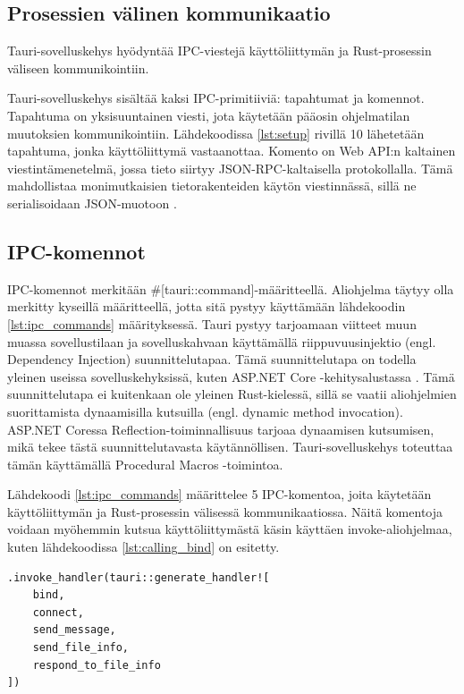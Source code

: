 \documentclass[a4paper,12pt]{article}
\begin{document}
    \subsection{Prosessien välinen kommunikaatio}
    Tauri-sovelluskehys hyödyntää IPC-viestejä käyttöliittymän ja Rust-prosessin väliseen kommunikointiin.

    Tauri-sovelluskehys sisältää kaksi IPC-primitiiviä: tapahtumat ja komennot.
    Tapahtuma on yksisuuntainen viesti, jota käytetään pääosin ohjelmatilan muutoksien kommunikointiin. Lähdekoodissa \ref{lst:setup} rivillä 10 lähetetään tapahtuma, jonka käyttöliittymä vastaanottaa. Komento on Web API:n kaltainen viestintämenetelmä, jossa tieto siirtyy JSON-RPC-kaltaisella protokollalla. Tämä mahdollistaa monimutkaisien tietorakenteiden käytön viestinnässä, sillä ne serialisoidaan JSON-muotoon \cite{tauri-app}.

    \subsection{IPC-komennot}
    IPC-komennot merkitään \#[tauri::command]-määritteellä. Aliohjelma täytyy olla merkitty kyseillä määritteellä, jotta sitä pystyy käyttämään lähdekoodin \ref{lst:ipc_commands} määrityksessä. Tauri pystyy tarjoamaan viitteet muun muassa sovellustilaan ja sovelluskahvaan käyttämällä riippuvuusinjektio (engl. Dependency Injection) suunnittelutapaa. Tämä suunnittelutapa on todella yleinen useissa sovelluskehyksissä, kuten ASP.NET Core -kehitysalustassa \cite{DI_dotnet}. Tämä suunnittelutapa ei kuitenkaan ole yleinen Rust-kielessä, sillä se vaatii aliohjelmien suorittamista dynaamisilla kutsuilla (engl. dynamic method invocation).
    ASP.NET Coressa Reflection-toiminnallisuus tarjoaa dynaamisen kutsumisen, mikä tekee tästä suunnittelutavasta käytännöllisen.
    Tauri-sovelluskehys toteuttaa tämän käyttämällä Procedural Macros -toimintoa. 


    Lähdekoodi \ref{lst:ipc_commands} määrittelee 5 IPC-komentoa, joita käytetään käyttöliittymän ja Rust-prosessin välisessä kommunikaatiossa. Näitä komentoja voidaan myöhemmin kutsua käyttöliittymästä käsin käyttäen invoke-aliohjelmaa, kuten lähdekoodissa \ref{lst:calling_bind} on esitetty. \par

    \begin{lstlisting}[caption={IPC-komentojen määritys.}, label={lst:ipc_commands}]
.invoke_handler(tauri::generate_handler![
    bind,
    connect,
    send_message,
    send_file_info,
    respond_to_file_info
])\end{lstlisting}
\end{document}
